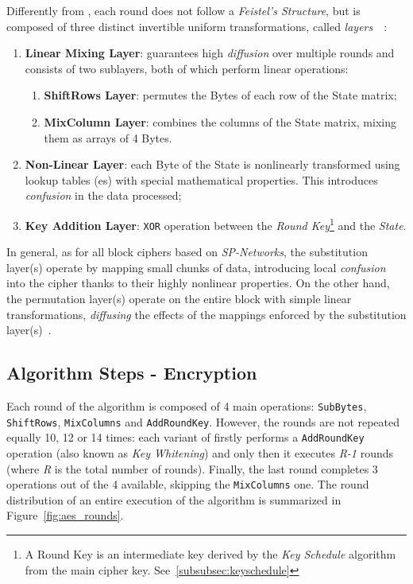     Differently from \des{}, each \aes{} round does not follow a \textit{Feistel's Structure}, but is composed of three distinct invertible uniform transformations, called \emph{layers}~\cite{daemen1999aes}~\cite{paar2009understanding}:

        \begin{enumerate}
            \item \textbf{Linear Mixing Layer}: guarantees high \emph{diffusion} over multiple rounds and consists of two sublayers, both of which perform linear operations:
            \begin{enumerate}
                \item \textbf{ShiftRows Layer}: permutes the Bytes of each row of the State matrix;
                \item \textbf{MixColumn Layer}: combines the columns of the State matrix, mixing them as arrays of 4 Bytes.
            \end{enumerate}
            \item \textbf{Non-Linear Layer}: each Byte of the State is nonlinearly transformed using lookup tables (\sbocs{}es) with special mathematical properties. This introduces \emph{confusion} in the data processed;
            \item \textbf{Key Addition Layer}: \texttt{XOR} operation between the \emph{Round Key}\footnote{A Round Key is an intermediate key derived by the \emph{Key Schedule} algorithm from the main cipher key. See~\ref{subsubsec:keyschedule}} and the \emph{State}.
        \end{enumerate}

    In general, as for all block ciphers based on \emph{SP-Networks}, the substitution layer(s) operate by mapping small chunks of data, introducing local \emph{confusion} into the cipher thanks to their highly nonlinear properties. On the other hand, the permutation layer(s) operate on the entire block with simple linear transformations, \emph{diffusing} the effects of the mappings enforced by the substitution layer(s)~\cite{decanniere2006cryptanalysis}.

    \subsection{Algorithm Steps - Encryption}
        Each round of the algorithm is composed of 4 main operations: \texttt{SubBytes}, \texttt{ShiftRows}, \texttt{MixColumns} and \texttt{AddRoundKey}.
        However, the rounds are not repeated equally 10, 12 or 14 times: each variant of \aes{} firstly performs a \texttt{AddRoundKey} operation (also known as \emph{Key Whitening}) and only then it executes \emph{R-1} rounds (where \emph{R} is the total number of rounds). Finally, the last round completes 3 operations out of the 4 available, skipping the \texttt{MixColumns} one.
        The round distribution of an entire execution of the \aes{} algorithm is summarized in Figure~\ref{fig:aes_rounds}.

